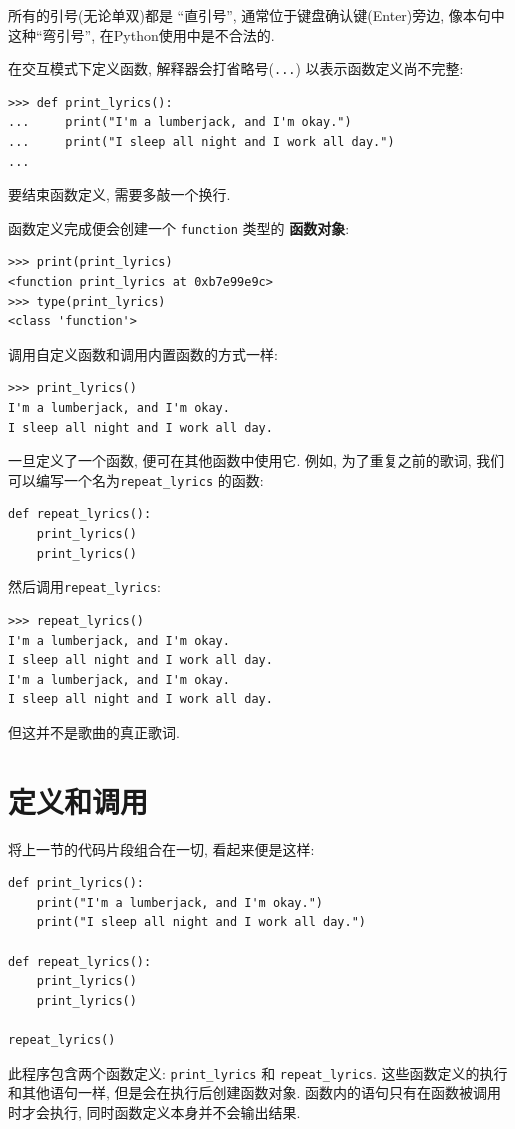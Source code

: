 \documentclass[10pt]{book}
\begin{document}
所有的引号(无论单双)都是 ``直引号'', 通常位于键盘确认键(Enter)旁边, 
像本句中这种``弯引号'', 在Python使用中是不合法的. 

在交互模式下定义函数, 解释器会打省略号({\tt ...}) 以表示函数定义尚不完整:

\begin{verbatim}
>>> def print_lyrics():
...     print("I'm a lumberjack, and I'm okay.")
...     print("I sleep all night and I work all day.")
...
\end{verbatim}
%
要结束函数定义, 需要多敲一个换行. 

函数定义完成便会创建一个 \verb"function" 类型的 {\bf 函数对象}:

\begin{verbatim}
>>> print(print_lyrics)
<function print_lyrics at 0xb7e99e9c>
>>> type(print_lyrics)
<class 'function'>
\end{verbatim}
%
调用自定义函数和调用内置函数的方式一样:

\begin{verbatim}
>>> print_lyrics()
I'm a lumberjack, and I'm okay.
I sleep all night and I work all day.
\end{verbatim}
%
一旦定义了一个函数, 便可在其他函数中使用它. 
例如, 为了重复之前的歌词, 
我们可以编写一个名为\verb"repeat_lyrics" 的函数:

\begin{verbatim}
def repeat_lyrics():
    print_lyrics()
    print_lyrics()
\end{verbatim}
%
然后调用\verb"repeat_lyrics":

\begin{verbatim}
>>> repeat_lyrics()
I'm a lumberjack, and I'm okay.
I sleep all night and I work all day.
I'm a lumberjack, and I'm okay.
I sleep all night and I work all day.
\end{verbatim}
%
但这并不是歌曲的真正歌词. 

\section{定义和调用}

将上一节的代码片段组合在一切, 看起来便是这样:

\begin{verbatim}
def print_lyrics():
    print("I'm a lumberjack, and I'm okay.")
    print("I sleep all night and I work all day.")

def repeat_lyrics():
    print_lyrics()
    print_lyrics()

repeat_lyrics()
\end{verbatim}
%
此程序包含两个函数定义: \verb"print_lyrics" 和 \verb"repeat_lyrics". 
这些函数定义的执行和其他语句一样, 但是会在执行后创建函数对象. 
函数内的语句只有在函数被调用时才会执行, 同时函数定义本身并不会输出结果. 
\end{document}

